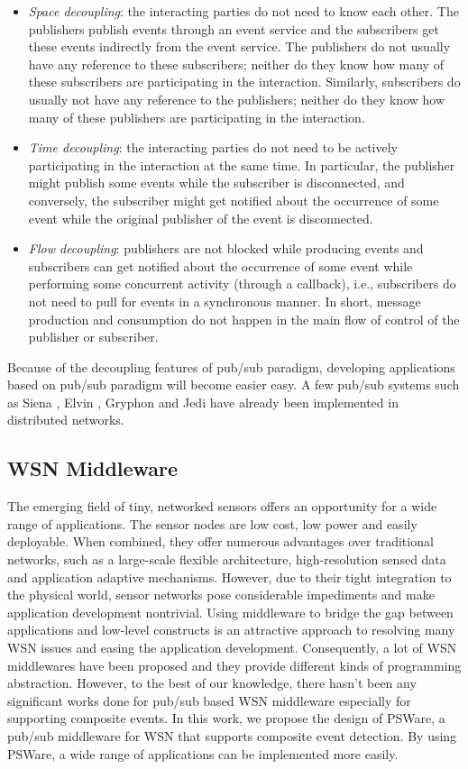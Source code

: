 \begin{itemize}
\item \emph{Space decoupling}: the interacting parties do not need to know each other. The publishers publish events through an event service and the subscribers get these events indirectly from the event service. The publishers do not usually have any reference to these subscribers; neither do they know how many of these subscribers are participating in the interaction. Similarly, subscribers do usually not have any reference to the publishers; neither do they know how many of these publishers are participating in the interaction.
\item \emph{Time decoupling}: the interacting parties do not need to be actively participating in the interaction at the same time. In particular, the publisher might publish some events while the subscriber is disconnected, and conversely, the subscriber might get notified about the occurrence of some event while the original publisher of the event is disconnected.
\item \emph{Flow decoupling}: publishers are not blocked while producing events and subscribers can get notified about the occurrence of some event while performing some concurrent activity (through a callback), i.e., subscribers do not need to pull for events in a synchronous manner. In short, message production and consumption do not happen in the main flow of control of the publisher or subscriber.
\end{itemize}

Because of the decoupling features of pub/sub paradigm, developing applications based on pub/sub paradigm will become easier easy. A few pub/sub systems such as Siena \cite{siena}, Elvin \cite{elvin}, Gryphon \cite{gryphon} and Jedi \cite{jedi} have already been implemented in distributed networks.

\subsection{WSN Middleware}
The emerging field of tiny, networked sensors offers an opportunity for a wide range of applications. The sensor nodes are low cost, low power and easily deployable. When combined, they offer numerous advantages over traditional networks, such as a large-scale flexible architecture, high-resolution sensed data and application adaptive mechanisms. However, due to their tight integration to the physical world, sensor networks pose considerable impediments and make application development nontrivial. Using middleware to bridge the gap between applications and low-level constructs is an attractive approach to resolving many WSN issues and easing the application development. Consequently, a lot of WSN middlewares have been proposed and they provide different kinds of programming abstraction. However, to the best of our knowledge, there hasn't been any significant works done for pub/sub based WSN middleware especially for supporting composite events. In this work, we propose the design of PSWare, a pub/sub middleware for WSN that supports composite event detection. By using PSWare, a wide range of applications can be implemented more easily.

